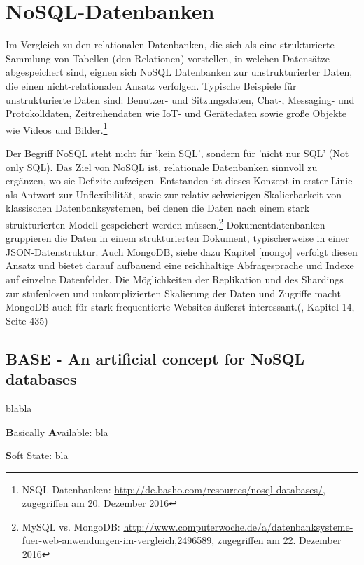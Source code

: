 \chapter{NoSQL-Datenbanken}
Im Vergleich zu den relationalen Datenbanken, die sich als eine strukturierte Sammlung von Tabellen (den Relationen) vorstellen, in welchen Datensätze abgespeichert sind, eignen sich NoSQL Datenbanken zur unstrukturierter Daten, die einen nicht-relationalen Ansatz verfolgen. Typische Beispiele für unstrukturierte Daten sind: Benutzer- und Sitzungsdaten, Chat-, Messaging- und Protokolldaten, Zeitreihendaten wie IoT- und Gerätedaten sowie große Objekte wie Videos und Bilder.\footnote{NSQL-Datenbanken: \url{http://de.basho.com/resources/nosql-databases/}, zugegriffen am 20. Dezember 2016}

Der Begriff NoSQL steht nicht für 'kein SQL', sondern für 'nicht nur SQL' (Not only SQL). Das Ziel von NoSQL ist, relationale Datenbanken sinnvoll zu ergänzen, wo sie Defizite aufzeigen. Entstanden ist dieses Konzept in erster Linie als Antwort zur Unflexibilität, sowie zur relativ schwierigen Skalierbarkeit von klassischen Datenbanksystemen, bei denen die Daten nach einem stark strukturierten Modell gespeichert werden müssen.\footnote{MySQL vs. MongoDB: \url{http://www.computerwoche.de/a/datenbanksysteme-fuer-web-anwendungen-im-vergleich,2496589}, zugegriffen am 22. Dezember 2016} Dokumentdatenbanken gruppieren die Daten in einem strukturierten Dokument, typischerweise in einer JSON-Datenstruktur. Auch MongoDB, siehe dazu Kapitel \ref{mongo} verfolgt diesen Ansatz und bietet darauf aufbauend eine reichhaltige Abfragesprache und Indexe auf einzelne Datenfelder. Die Möglichkeiten der Replikation und des Shardings zur stufenlosen und unkomplizierten Skalierung der Daten und Zugriffe macht MongoDB auch für stark frequentierte Websites äußerst interessant.(\cite{Hollosi.2012}, Kapitel 14, Seite 435)

\section{BASE - An artificial concept for NoSQL databases}
blabla

\textbf{B}asically \textbf{A}vailable: bla

\textbf{S}oft State: bla

